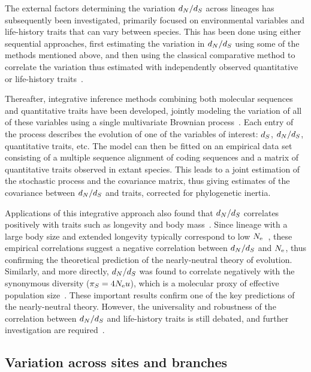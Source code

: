 The external factors determining the variation $d_N / d_S$ across lineages has subsequently been investigated, primarily focused on environmental variables and life-history traits that can vary between species.
This has been done using either sequential approaches, first estimating the variation in $d_N / d_S$ using some of the methods mentioned above, and then using the classical comparative method to correlate the variation thus estimated with independently observed quantitative or life-history traits~\citep{Popadin2007, Lanfear2010, Romiguier2014}.

Thereafter, integrative inference methods combining both molecular sequences and quantitative traits have been developed, jointly modeling the variation of all of these variables using a single multivariate Brownian process~\citep{Lartillot2011}.
Each entry of the process describes the evolution of one of the variables of interest: $d_S$, $d_N / d_S$, quantitative traits, etc.
The model can then be fitted on an empirical data set consisting of a multiple sequence alignment of coding sequences and a matrix of quantitative traits observed in extant species.
This leads to a joint estimation of the stochastic process and the covariance matrix, thus giving estimates of the covariance between $d_N / d_S$ and traits, corrected for phylogenetic inertia.

Applications of this integrative approach also found that $d_N / d_S$ correlates positively with traits such as longevity and body mass~\citep{Lartillot2011, Figuet2017}.
Since lineage with a large body size and extended longevity typically correspond to low $N_{\textrm{e}}$~\citep{Romiguier2014}, these empirical correlations suggest a negative correlation between $d_N / d_S$ and $N_{\textrm{e}}$, thus confirming the theoretical prediction of the nearly-neutral theory of evolution.
Similarly, and more directly, $d_N / d_S$ was found to correlate negatively with the synonymous diversity ($\pi_S = 4 N_{\textrm{e}} u$), which is a molecular proxy of effective population size~\citep{Brevet2019}.
These important results confirm one of the key predictions of the nearly-neutral theory.
However, the universality and robustness of the correlation between $d_N / d_S$ and life-history traits is still debated, and further investigation are required~\citep{Nabholz2013,Lanfear2014,Figuet2016, Bolivar2019}.

\subsection{Variation across sites and branches}
\label{subsec:variation-across-sites-and-branches}


